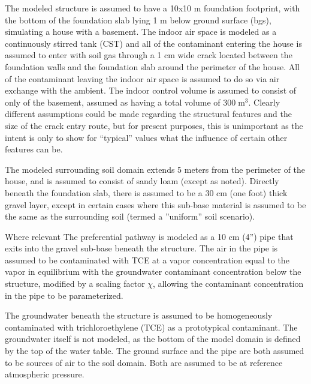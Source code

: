 \documentclass[journal=esthag,manuscript=article]{achemso}
\begin{document}
The modeled structure is assumed to have a 10x10 m foundation footprint, with the bottom of the foundation slab lying 1 m below ground surface (bgs), simulating a house with a basement.
The indoor air space is modeled as a continuously stirred tank (CST)\cite{u.s._environmental_protection_agency_oswer_2015} and all of the contaminant entering the house is assumed to enter with soil gas through a 1 cm wide crack located between the foundation walls and the foundation slab around the perimeter of the house.
All of the contaminant leaving the indoor air space is assumed to do so via air exchange with the ambient.
The indoor control volume is assumed to consist of only of the basement, assumed as having a total volume of $300 \; \mathrm{m^3}$.
Clearly different assumptions could be made regarding the structural features and the size of the crack entry route, but for present purposes, this is unimportant as the intent is only to show for “typical” values what the influence of certain other features can be. \par

The modeled surrounding soil domain extends 5 meters from the perimeter of the house, and is assumed to consist of sandy loam (except as noted).
Directly beneath the foundation slab, there is assumed to be a 30 cm (one foot) thick gravel layer, except in certain cases where this sub-base material is assumed to be the same as the surrounding soil (termed  a ”uniform” soil scenario). \par

Where relevant The preferential pathway is modeled as a 10 cm (4”) pipe that exits into the gravel sub-base beneath the structure.
The air in the pipe is assumed to be contaminated with TCE at a vapor concentration equal to the vapor in equilibrium with the groundwater contaminant concentration below the structure, modified by a scaling factor $\chi$, allowing the contaminant concentration in the pipe to be parameterized. \par

The groundwater beneath the structure is assumed to be homogeneously contaminated with trichloroethylene (TCE) as a prototypical contaminant.
The groundwater itself is not modeled, as the bottom of the model domain is defined by the top of the water table.
The ground surface and the pipe are both assumed to be sources of air to the soil domain.
Both are assumed to be at reference atmospheric pressure. \par
\end{document}
